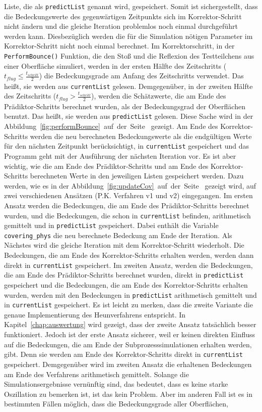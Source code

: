 \documentclass{listhesis}
\begin{document}
Liste, die als \texttt{predictList} genannt wird, gespeichert. Somit ist sichergestellt, dass die Bedeckungswerte des gegenwärtigen Zeitpunkts sich im Korrektor-Schritt nicht ändern und die gleiche Iteration problemlos noch einmal durchgeführt werden kann. Diesbezüglich werden die für die Simulation nötigen Parameter im Korrektor-Schritt nicht noch einmal berechnet. Im Korrektorschritt, in der \texttt{PerformBounce()} Funktion, die den Stoß und die Reflexion des Testteilchens aus einer Oberfläche simuliert, werden in der ersten Hälfte des Zeitschritts ($t_{flug} \le \frac{t_{schritt}}{2}$) die Bedeckungsgrade am Anfang des Zeitschritts verwendet. Das heißt, sie werden aus \texttt{currentList} gelesen. Demgegenüber, in der zweiten Hälfte des Zeitschritts ($t_{flug} > \frac{t_{schritt}}{2}$), werden die Schätzwerte, die am Ende des Prädiktor-Schritts berechnet wurden, als der Bedeckungsgrad der Oberflächen benutzt. Das heißt, sie werden aus \texttt{predictList} gelesen. Diese Sache wird in der Abbildung~\ref{fig:performBounce}~auf~der~Seite~\pageref{fig:updateCov} gezeigt. Am Ende des Korrektor-Schritts werden die neu berechneten Bedeckungswerte als die endgültigen Werte für den nächsten Zeitpunkt berücksichtigt, in \texttt{currentList} gespeichert und das Programm geht mit der Ausführung der nächsten Iteration vor. Es ist aber wichtig, wie die am Ende des Prädiktor-Schritts und am Ende des Korrektor-Schritts berechneten Werte in den jeweiligen Listen gespeichert werden. Dazu werden, wie es in der Abbildung~\ref{fig:updateCov}~auf~der~Seite~\pageref{fig:updateCov} gezeigt wird, auf zwei verschiedenen Ansätzen (P.K. Verfahren v1 und v2) eingegangen. Im ersten Ansatz werden die Bedeckungen, die am Ende des Prädiktor-Schritts berechnet wurden, und die Bedeckungen, die schon in \texttt{currentList} befinden, arithmetisch gemittelt und in \texttt{predictList} gespeichert. Dabei enthält die Variable \texttt{covering\_phys} die neu berechnete Bedeckung am Ende der Iteration. Als Nächstes wird die gleiche Iteration mit dem Korrektor-Schritt wiederholt. Die Bedeckungen, die am Ende des Korrektor-Schritts erhalten werden, werden dann direkt in \texttt{currentList} gespeichert. Im zweiten Ansatz, werden die Bedeckungen, die am Ende des Prädiktor-Schritts berechnet wurden, direkt in \texttt{predictList} gespeichert und die Bedeckungen, die am Ende des Korrektor-Schritts erhalten wurden, werden mit den Bedeckungen in \texttt{predictList} arithmetisch gemittelt und in \texttt{currentList} gespeichert. Es ist leicht zu merken, dass die zweite Variante die genaue Implementierung des Heunverfahrens entspricht. In Kapitel~\ref{chap:auswertung} wird gezeigt, dass der zweite Ansatz tatsächlich besser funktioniert. Jedoch ist der erste Ansatz sicherer, weil er keinen direkten Einfluss auf die Bedeckungen, die am Ende der Subprozesssimulationen erhalten werden, gibt. Denn sie werden am Ende des Korrektor-Schritts direkt in \texttt{currentList} gespeichert. Demgegenüber wird im zweiten Ansatz die erhaltenen Bedeckungen am Ende des Verfahrens arithmetisch gemittelt. Solange die Simulationsergebnisse vernünftig sind, das bedeutet, dass es keine starke Oszillation zu bemerken ist, ist das kein Problem. Aber im anderen Fall ist es in bestimmten Fällen möglich, dass die Bedeckungsgrade aller Oberflächen, 
\end{document}
